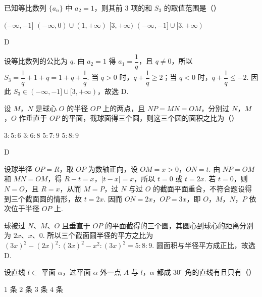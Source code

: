 \begin{problem}
已知等比数列 \(\{a_n\}\) 中 \(a_2=1\)，则其前 \(3\) 项的和 \(S_3\) 的取值范围是（\quad）

\choices
    {\((-\infty,-1]\)}
    {\((-\infty,0)\cup(1,+\infty)\)}
    {\([3,+\infty)\)}
    {\((-\infty,-1]\cup[3,+\infty)\)}
\end{problem}

\begin{answer}
D
\end{answer}

\begin{solution}
设等比数列的公比为 \(q\). 由 \(a_2=1\) 得 \(a_1=\dfrac1q\)，且 \(q\ne0\)，所以 \(S_3=\dfrac1q+1+q=1+q+\dfrac1q\). 当 \(q>0\) 时，\(q+\dfrac1q\geqslant2\)；当 \(q<0\) 时，\(q+\dfrac1q\leqslant-2\). 因此 \(S_3\in(-\infty,-1]\cup[3,+\infty)\)，故选 D.
\end{solution}

\begin{problem}
设 \(M\)，\(N\) 是球心 \(O\) 的半径 \(OP\) 上的两点，且 \(NP=MN=OM\)，分别过 \(N\)，\(M\)，\(O\) 作垂直于 \(OP\) 的平面，截球面得三个圆，则这三个圆的面积之比为（\quad）

\choices
    {\(3:5:6\)}
    {\(3:6:8\)}
    {\(5:7:9\)}
    {\(5:8:9\)}
\end{problem}

\begin{answer}
D
\end{answer}

\begin{solution}
设球半径 \(OP=R\)，取 \(OP\) 为数轴正向，设 \(OM=x>0\)，\(ON=t\). 由 \(NP=OM\) 和 \(MN=OM\)，得 \(R-t=x\)，\(\lvert t-x\rvert=x\)，所以 \(t=0\) 或 \(t=2x\). 若 \(t=0\)，则 \(N=O\)，且 \(R=x\)，从而 \(M=P\)，过 \(N\) 与过 \(O\) 的截面平面重合，不符合题设得到三个截面圆的情形，故 \(t=2x\). 因而 \(ON=2x\)，\(OP=3x\)，即 \(O\)，\(M\)，\(N\)，\(P\) 依次位于半径 \(OP\) 上.

球被过 \(N\)、\(M\)、\(O\) 且垂直于 \(OP\) 的平面截得的三个圆，其圆心到球心的距离分别为 \(2x\)、\(x\)、\(0\). 所以三个截面圆半径的平方之比为 \((3x)^2-(2x)^2:(3x)^2-x^2:(3x)^2=5:8:9\). 圆面积与半径平方成正比，故选 D.
\end{solution}

\begin{problem}
设直线 \(l\subset\) 平面 \(\alpha\)，过平面 \(\alpha\) 外一点 \(A\) 与 \(l\)，\(\alpha\) 都成 \(30^{\circ}\) 角的直线有且只有（\quad）

\choices
    {\(1\) 条}
    {\(2\) 条}
    {\(3\) 条}
    {\(4\) 条}
\end{problem}

